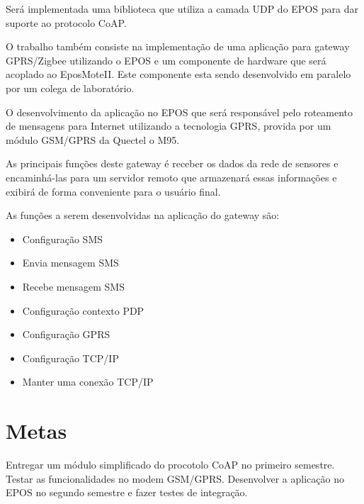 Ser\'a implementada uma biblioteca que utiliza a camada UDP do EPOS para dar suporte ao protocolo CoAP.

O trabalho tamb\'em consiste na implementa\c{c}\~ao de uma aplica\c{c}\~ao para gateway GPRS/Zigbee utilizando o EPOS e um componente de hardware que ser\'a acoplado ao EposMoteII. Este componente esta sendo desenvolvido em paralelo por um colega de laborat\'orio.

O desenvolvimento da aplica\c{c}\~ao no EPOS que ser\'a respons\'avel pelo roteamento de mensagens para Internet utilizando a tecnologia GPRS, provida por um m\'odulo GSM/GPRS da Quectel o M95.

As principais fun\c{c}\~oes deste gateway \'e receber os dados da rede de sensores e encaminh\'a-las para um servidor remoto que armazenar\'a essas informa\c{c}\~oes e exibir\'a de forma conveniente para o usu\'ario final.

As fun\c{c}\~oes a serem desenvolvidas na aplica\c{c}\~ao do gateway s\~ao:

\begin{itemize}
    \item Configura\c{c}\~ao SMS
    \item Envia mensagem SMS
    \item Recebe mensagem SMS
    \item Configura\c{c}\~ao contexto PDP
    \item Configura\c{c}\~ao GPRS
    \item Configura\c{c}\~ao TCP/IP
    \item Manter uma conex\~ao TCP/IP 
\end{itemize}

\section{Metas}
Entregar um m\'odulo simplificado do procotolo CoAP no primeiro semestre.
Testar as funcionalidades no modem GSM/GPRS.
Desenvolver a aplica\c{c}\~ao no EPOS no segundo semestre e fazer testes de integra\c{c}\~ao.

